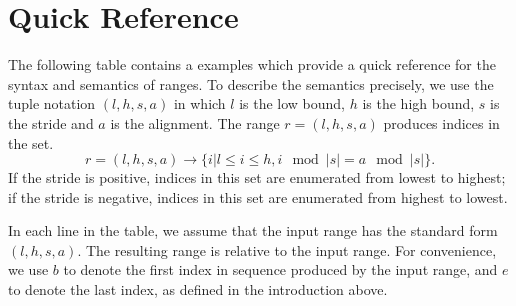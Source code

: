 \section{Quick Reference}

The following table contains a examples which provide a quick reference for the
syntax and semantics of ranges.  To describe the semantics precisely, we use the
tuple notation $(l, h, s, a)$ in which $l$ is the low bound, $h$ is the high
bound, $s$ is the stride and $a$ is the alignment.  The range $r = (l, h, s, a)$
produces indices in the set.
\begin{equation}
r = (l, h, s, a) \rightarrow \{i | l \le i \le h, i\!\mod |s| = a\!\mod |s|\}.
\end{equation}
\noindent If the stride is positive, indices in this set are enumerated from lowest to
highest; if the stride is negative, indices in this set are enumerated from
highest to lowest.  

In each line in the table, we assume that the input range has the
standard form $(l, h, s, a)$.  The resulting range is relative to the input
range.  For convenience, we use $b$ to denote the first index in sequence
produced by the input range, and $e$ to denote the last index, as defined in
the introduction above.

